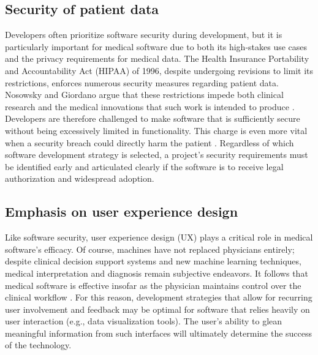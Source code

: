 \documentclass[12pt]{article} %
\begin{document}
\subsection{Security of patient data}
Developers often prioritize software security during development, but it is particularly important for medical software due to both its high-stakes use cases and the privacy requirements for medical data.
The Health Insurance Portability and Accountability Act (HIPAA) of 1996, despite undergoing revisions to limit its restrictions, enforces numerous security measures regarding patient data. Nosowsky and Giordano argue that these restrictions impede both clinical research and the medical innovations that such work is intended to produce \cite{nosowsky2006}. Developers are therefore challenged to make software that is sufficiently secure without being excessively limited in functionality. This charge is even more vital when a security breach could directly harm the patient \cite{jetley2013}. Regardless of which software development strategy is selected, a project's security requirements must be identified early and articulated clearly if the software is to receive legal authorization and widespread adoption.

\subsection{Emphasis on user experience design}
Like software security, user experience design (UX) plays a critical role in medical software's efficacy. 
Of course, machines have not replaced physicians entirely; despite clinical decision support systems and new machine learning techniques, medical interpretation and diagnosis remain subjective endeavors. It follows that medical software is effective insofar as the physician maintains control over the clinical workflow \cite{weber2013}. For this reason, development strategies that allow for recurring user involvement and feedback may be optimal for software that relies heavily on user interaction \cite{lau2010} (e.g., data visualization tools). The user's ability to glean meaningful information from such interfaces will ultimately determine the success of the technology.
\end{document}
